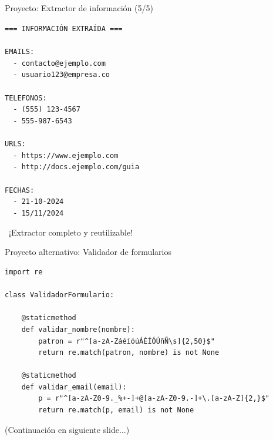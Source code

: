 \documentclass{beamer}
\begin{document}
\begin{frame}[fragile]{Proyecto: Extractor de información (5/5) \faTerminal}
\begin{tcolorbox}[colback=green!10,colframe=green,title={\small\faArrowCircleRight \ Salida},coltitle=fg0,left=3pt,right=3pt,top=2pt,bottom=2pt,boxsep=1pt]
\tiny\texttt{=== INFORMACIÓN EXTRAÍDA ===\\
\ \\
EMAILS:\\
\ \ - contacto@ejemplo.com\\
\ \ - usuario123@empresa.co\\
\ \\
TELEFONOS:\\
\ \ - (555) 123-4567\\
\ \ - 555-987-6543\\
\ \\
URLS:\\
\ \ - https://www.ejemplo.com\\
\ \ - http://docs.ejemplo.com/guia\\
\ \\
FECHAS:\\
\ \ - 21-10-2024\\
\ \ - 15/11/2024}
\end{tcolorbox}

\vspace{-0.1cm}
\begin{notebox}
\small\faRocket\ ¡Extractor completo y reutilizable!
\end{notebox}
\end{frame}

\begin{frame}[fragile]{Proyecto alternativo: Validador de formularios \faCheckSquare}
\begin{lstlisting}
import re

class ValidadorFormulario:
    
    @staticmethod
    def validar_nombre(nombre):
        patron = r"^[a-zA-ZáéíóúÁÉÍÓÚñÑ\s]{2,50}$"
        return re.match(patron, nombre) is not None
    
    @staticmethod
    def validar_email(email):
        p = r"^[a-zA-Z0-9._%+-]+@[a-zA-Z0-9.-]+\.[a-zA-Z]{2,}$"
        return re.match(p, email) is not None
\end{lstlisting}

\small(Continuación en siguiente slide...)
\end{frame}
\end{document}
